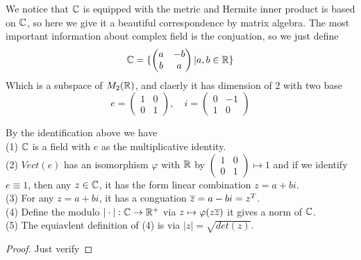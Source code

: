 \documentclass[en,geye,blue,normal,12pt]{elegantnote}
\begin{document}
We notice that \(\mathbb{C}\) is equipped with the metric and Hermite inner product is based on \(\mathbb{C}\), so here we give it a beautiful correspondence by matrix algebra. The most important information about complex field is the conjuation, so we just define 
\[\mathbb{C} = \{\begin{pmatrix}
a &-b \\
b &a
\end{pmatrix}| a,b\in \mathbb{R}\}\]
Which is a subspace of \(M_2(\mathbb{R})\), and claerly it has dimension of 2 with two base
\[e = \begin{pmatrix}
  1 &0 \\
  0 &1 
\end{pmatrix}, \quad i = \begin{pmatrix}
  0 &-1\\
  1 &0
\end{pmatrix}\]

\begin{proposition} By the identification above we have
  \\(1) \(\mathbb{C}\) is a field with \(e\) as the multiplicative identity.
  \\(2) \(Vect(e)\) has an isomorphism \(\varphi\) with \(\mathbb{R}\) by \(\begin{pmatrix}
    1 &0 \\
    0 &1
  \end{pmatrix}\mapsto 1\) and if we identify \(e \equiv 1 \), then any \(z \in \mathbb{C}\), it has the form linear combination \(z = a+bi\).
  \\(3) For any \(z=a+bi\), it has a conguation \(\overline{z} = a -bi = z^T\).
  \\(4) Define the modulo \(|\cdot|:\mathbb{C} \to \mathbb{R}^+\) via \(z \mapsto \varphi(z \overline{z}) \) it gives a norm of \(\mathbb{C}\).
  \\(5) The equiavlent definition of (4) is via \(|z| = \sqrt{det(z)}\).
  \begin{proof}
    Just verify
  \end{proof}
\end{proposition}
\end{document}
